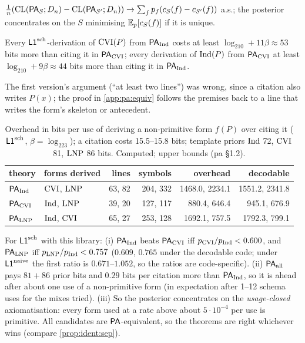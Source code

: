 \begin{proposition}\pabrk{}\label{prop:pa:usage}
$\frac1n(\mathrm{CL}(\mathsf{PA}_S;D_n)-\mathrm{CL}(\mathsf{PA}_{S'};D_n))\to\sum_fp_f(c_S(f)-c_{S'}(f))$ a.s.; the posterior concentrates on the $S$ minimising $\mathbb{E}_p[c_S(f)]$ if it is unique.
\end{proposition}

\begin{proposition}\pabrk{}\label{prop:pa:lower}
Every $\mathord{\mathsf{L1}}^{\mathrm{sch}}$-derivation of $\mathrm{CVI}(P)$ from $\mathsf{PA}_{\mathrm{Ind}}$ costs at least $\log_210+11\beta\approx53$ bits more than citing it in $\mathsf{PA}_{\mathrm{CVI}}$; every derivation of $\mathrm{Ind}(P)$ from $\mathsf{PA}_{\mathrm{CVI}}$ at least $\log_210+9\beta\approx44$ bits more than citing it in $\mathsf{PA}_{\mathrm{Ind}}$.
\end{proposition}

\noindent The first version's argument (``at least two lines'') was wrong, since a citation also writes $P(x)$; the proof in \cref{app:pa:equiv} follows the premises back to a line that writes the form's skeleton or antecedent.

\begin{table}[t]\centering\footnotesize
\begin{tabular}{@{}llrrrr@{}}
\toprule
theory & forms derived & lines & symbols & overhead & decodable\\
\midrule
$\mathsf{PA}_{\mathrm{Ind}}$ & $\mathrm{CVI}$, $\mathrm{LNP}$ & 63, 82 & 204, 332 & 1468.0, 2234.1 & 1551.2, 2341.8\\
$\mathsf{PA}_{\mathrm{CVI}}$ & $\mathrm{Ind}$, $\mathrm{LNP}$ & 39, 20 & 127, 117 & 880.4, 646.4 & 945.1, 676.9\\
$\mathsf{PA}_{\mathrm{LNP}}$ & $\mathrm{Ind}$, $\mathrm{CVI}$ & 65, 27 & 253, 128 & 1692.1, 757.5 & 1792.3, 799.1\\
\bottomrule
\end{tabular}
\caption{Overhead in bits per use of deriving a non-primitive form $f(P)$ over citing it ($\mathord{\mathsf{L1}}^{\mathrm{sch}}$, $\beta=\log_223$); a citation costs 15.5--15.8 bits; template priors $\mathrm{Ind}$ 72, $\mathrm{CVI}$ 81, $\mathrm{LNP}$ 86 bits. Computed; upper bounds (pa \S1.2).}\label{tab:pa:costs}
\end{table}

\begin{remark}\pabrk{}\label{rem:pa:usage}
For $\mathord{\mathsf{L1}}^{\mathrm{sch}}$ with this library: (i) $\mathsf{PA}_{\mathrm{Ind}}$ beats $\mathsf{PA}_{\mathrm{CVI}}$ iff $p_{\mathrm{CVI}}/p_{\mathrm{Ind}}<0.600$, and $\mathsf{PA}_{\mathrm{LNP}}$ iff $p_{\mathrm{LNP}}/p_{\mathrm{Ind}}<0.757$ ($0.609$, $0.765$ under the decodable code; under $\mathord{\mathsf{L1}}^{\mathrm{naive}}$ the first ratio is $0.671$--$1.052$, so the ratios are code-specific). (ii) $\mathsf{PA}_{\mathrm{all}}$ pays $81+86$ prior bits and $0.29$ bits per citation more than $\mathsf{PA}_{\mathrm{Ind}}$, so it is ahead after about one use of a non-primitive form (in expectation after 1--12 schema uses for the mixes tried). (iii) So the posterior concentrates on the \emph{usage-closed} axiomatisation: every form used at a rate above about $5\cdot10^{-4}$ per use is primitive. All candidates are $\mathsf{PA}$-equivalent, so the theorems are right whichever wins (compare \cref{prop:ident:sep}).
\end{remark}

